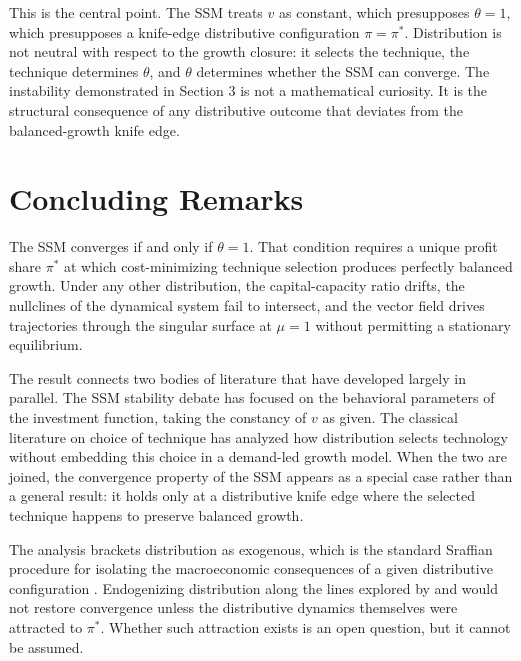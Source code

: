 \documentclass[12pt, a4paper]{article}
\theoremstyle{definition}
\theoremstyle{remark}
\begin{document}
This is the central point. The SSM treats $v$ as constant, which presupposes $\theta = 1$, which presupposes a knife-edge distributive configuration $\pi = \pi^*$. Distribution is not neutral with respect to the growth closure: it selects the technique, the technique determines $\theta$, and $\theta$ determines whether the SSM can converge. The instability demonstrated in Section 3 is not a mathematical curiosity. It is the structural consequence of any distributive outcome that deviates from the balanced-growth knife edge.

\section{Concluding Remarks}

The SSM converges if and only if $\theta = 1$. That condition requires a unique profit share $\pi^*$ at which cost-minimizing technique selection produces perfectly balanced growth. Under any other distribution, the capital-capacity ratio drifts, the nullclines of the dynamical system fail to intersect, and the vector field drives trajectories through the singular surface at $\mu = 1$ without permitting a stationary equilibrium.

The result connects two bodies of literature that have developed largely in parallel. The SSM stability debate \citep{allain2015, lavoie2016, freitas2015, nah2017} has focused on the behavioral parameters of the investment function, taking the constancy of $v$ as given. The classical literature on choice of technique \citep{kurz1995, foley1999} has analyzed how distribution selects technology without embedding this choice in a demand-led growth model. When the two are joined, the convergence property of the SSM appears as a special case rather than a general result: it holds only at a distributive knife edge where the selected technique happens to preserve balanced growth.

The analysis brackets distribution as exogenous, which is the standard Sraffian procedure for isolating the macroeconomic consequences of a given distributive configuration \citep{cesaratto2015}. Endogenizing distribution along the lines explored by \citet{palley2019} and \citet{hein2018} would not restore convergence unless the distributive dynamics themselves were attracted to $\pi^*$. Whether such attraction exists is an open question, but it cannot be assumed.
\end{document}
